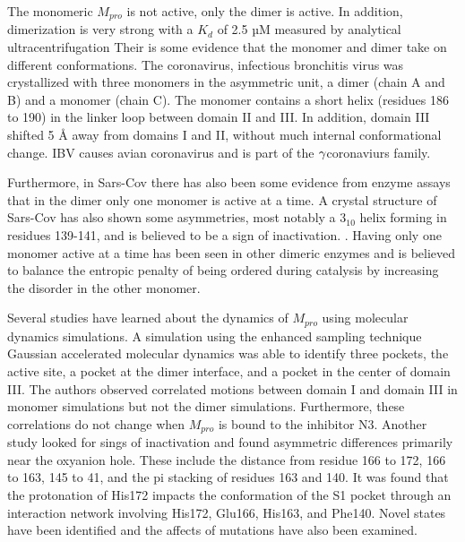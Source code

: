 \documentclass{biophys-new}
\begin{document}
The monomeric $M_{pro}$ is not active, only the dimer is active.\cite{chen2006only} In addition, dimerization is very strong with a $K_{d}$ of 2.5 µM measured by analytical ultracentrifugation \cite{Zhang409} Their is some evidence that the monomer and dimer take on different conformations. The coronavirus, infectious bronchitis virus was crystallized with three monomers in the asymmetric unit, a dimer (chain A and B) and a monomer (chain C)\cite{xue2008structures}. The monomer contains a short helix (residues 186 to 190) in the linker loop between domain II and III. In addition, domain III shifted 5 Å away from domains I and II, without much internal conformational change. IBV causes avian coronavirus and is part of the $\MakeUppercase{\gamma}$coronaviurs family.

Furthermore, in Sars-Cov there has also been some evidence from enzyme assays that in the dimer only one monomer is active at a time\cite{chen2006only}. A crystal structure of Sars-Cov has also shown some asymmetries, most notably a $3_{10}$ helix forming in residues 139-141, and is believed to be a sign of inactivation. \cite{yang2003crystal}. Having only one monomer active at a time has been seen in other dimeric enzymes and is believed to balance the entropic penalty of being ordered during catalysis by increasing the disorder in the other monomer.\cite{kim2017role}

Several studies have learned about the dynamics of $M_{pro}$ using molecular dynamics simulations. A simulation using the enhanced sampling technique Gaussian accelerated molecular dynamics was able to identify three pockets, the active site, a pocket at the dimer interface, and a pocket in the center of domain III. The authors observed correlated motions between domain I and domain III in monomer simulations but not the dimer simulations. Furthermore, these correlations do not change when $M_{pro}$ is bound to the inhibitor N3\cite{sztain2020elucidation}. Another study looked for sings of inactivation and found asymmetric differences primarily near the oxyanion hole. These include the distance from residue 166 to 172, 166 to 163, 145 to 41, and the pi stacking of residues 163 and 140.\cite{inizan2021high} It was found that the protonation of His172  impacts the conformation of the S1 pocket through an interaction network involving His172, Glu166, His163, and Phe140.\cite{verma2020proton} Novel states have been identified \cite{carli2020candidate, cocina2020sapphire} and the affects of mutations have also been examined. \cite{dubanevics2021computational, zhou2019identification}
\end{document}
